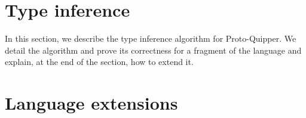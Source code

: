 \documentclass[twoside]{article}
\begin{document}
\clearpage
\section{Type inference}\label{sec-inference}

In this section, we describe the type inference algorithm 
for Proto-Quipper. We detail the algorithm and prove its 
correctness for a fragment of the language and explain, 
at the end of the section, how to extend it.




\clearpage
\section{Language extensions}
\label{sec-extensions}
\end{document}
